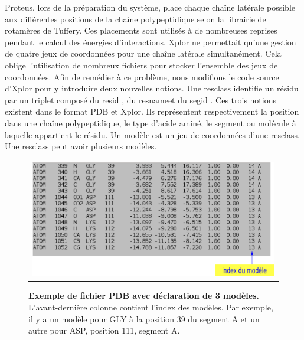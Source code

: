 Proteus, lors de la préparation du système, place chaque chaîne latérale possible aux différentes positions de la chaîne polypeptidique selon la librairie de rotamères de Tuffery. Ces placements sont utilisés à de nombreuses reprises pendant le calcul des énergies d'interactions. Xplor ne permettait qu'une gestion de quatre jeux de coordonnées pour une chaîne latérale simultanément. Cela oblige l'utilisation de nombreux fichiers pour stocker l'ensemble des jeux de coordonnées. Afin de remédier à ce problème, nous modifions le code source d'Xplor pour y introduire deux nouvelles notions. Une \og resclass \fg identifie un résidu par un triplet composé du \og resid \fg, du \og resname\fg et du \og segid \fg. Ces trois notions existent dans le format PDB et Xplor. Ils représentent respectivement la position dans une chaîne polypeptidique, le type d'acide aminé, le segment ou molécule à laquelle appartient le résidu. Un \og modèle \fg est un jeu de coordonnées d'une resclass. Une resclass peut avoir plusieurs modèles.
   \begin{figure}[!htbp]
     \centering
     \begin{tabular}{c}
       \includegraphics[width=13cm]{figure/PDB.png} 
     \end{tabular}     
     \caption{\textbf{Exemple de fichier PDB avec déclaration de 3 modèles.} L'avant-dernière colonne contient l'index des modèles. Par exemple, il y a un modèle pour GLY à la position 39 du segment A et un autre pour ASP, position 111, segment A.}
\label{fig:PDB}
   \end{figure}

